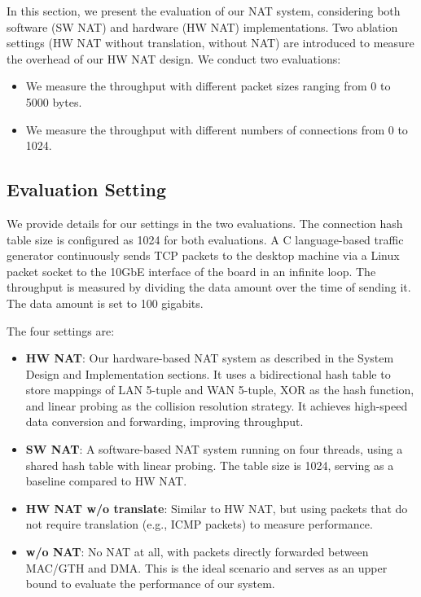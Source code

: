 In this section, we present the evaluation of our NAT system, considering both software (SW NAT) and hardware (HW NAT) implementations. Two ablation settings (HW NAT without translation, without NAT) are introduced to measure the overhead of our HW NAT design. We conduct two evaluations:

\begin{itemize}
    \item We measure the throughput with different packet sizes ranging from 0 to 5000 bytes.
    \item We measure the throughput with different numbers of connections from 0 to 1024.
\end{itemize}

\subsection{Evaluation Setting}

We provide details for our settings in the two evaluations. The connection hash table size is configured as 1024 for both evaluations. A C language-based traffic generator continuously sends TCP packets to the desktop machine via a Linux packet socket to the 10GbE interface of the board in an infinite loop. The throughput is measured by dividing the data amount over the time of sending it. The data amount is set to 100 gigabits.

The four settings are:

\begin{itemize}
    \item \textbf{HW NAT}: Our hardware-based NAT system as described in the System Design and Implementation sections. It uses a bidirectional hash table to store mappings of LAN 5-tuple and WAN 5-tuple, XOR as the hash function, and linear probing as the collision resolution strategy. It achieves high-speed data conversion and forwarding, improving throughput.
    \item \textbf{SW NAT}: A software-based NAT system running on four threads, using a shared hash table with linear probing. The table size is 1024, serving as a baseline compared to HW NAT.
    \item \textbf{HW NAT w/o translate}: Similar to HW NAT, but using packets that do not require translation (e.g., ICMP packets) to measure performance.
    \item \textbf{w/o NAT}: No NAT at all, with packets directly forwarded between MAC/GTH and DMA. This is the ideal scenario and serves as an upper bound to evaluate the performance of our system.
\end{itemize}

